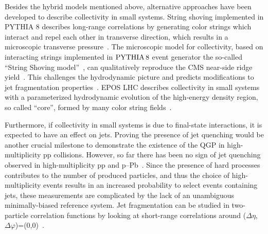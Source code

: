 Besides the hybrid models mentioned above, alternative approaches have been developed to describe collectivity in small systems. String shoving implemented in PYTHIA 8 describes long-range correlations by generating color strings which interact and repel each other in transverse direction, which results in a microscopic transverse pressure~\cite{Bierlich:2017vhg}. The microscopic model for collectivity, based on interacting strings implemented in $\mathrm{PYTHIA}\,8$ event generator the so-called ``String Shoving model''~\cite{Bierlich:2017vhg}, can qualitatively reproduce the CMS near-side ridge yield~\cite{Khachatryan:2016txc}. This challenges the hydrodynamic picture and predicts modifications to jet fragmentation properties~\cite{Bierlich:2019ixq}.
EPOS LHC describes collectivity in small systems with a parameterized hydrodynamic evolution of the high-energy density region, so called ``core'', formed by many color string fields~\cite{Pierog:2013ria}.

Furthermore, if collectivity in small systems is due to final-state interactions, it is expected to have an effect on jets. Proving the presence of jet quenching would be another crucial milestone to demonstrate the existence of the QGP in high-multiplicity pp collisions. However, so far there has been no sign of jet quenching observed in high-multiplicity pp and p--Pb~\cite{Khachatryan:2016odn,Adam:2016jfp,Adam:2016dau,Acharya:2017okq}.
Since the presence of hard processes contributes to the number of produced particles, and thus the choice of high-multiplicity events results in an increased probability to select events containing jets, these measurements are complicated by the lack of an unambiguous minimally-biased reference system. Jet fragmentation can be studied in two-particle correlation functions by looking at short-range correlations around ($\Delta\eta$,$\Delta\varphi$)=(0,0)~\cite{Adam:2016tsv}.  


